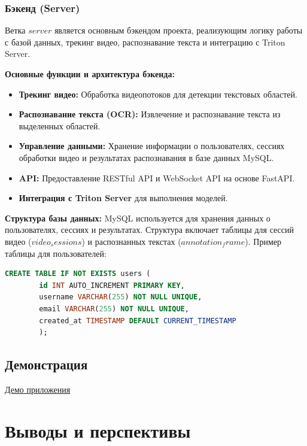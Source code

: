 \documentclass[12pt, a4paper]{article}
\theoremstyle{definition}
\theoremstyle{remark}
\begin{document}
	\subsubsection{Бэкенд (Server)}
	Ветка $server$ является основным бэкендом проекта, реализующим логику работы с базой данных, трекинг видео, распознавание текста и интеграцию с Triton Server.
	
	\textbf{Основные функции и архитектура бэкенда:}
	\begin{itemize}
		\item \textbf{Трекинг видео:} Обработка видеопотоков для детекции текстовых областей.
		\item \textbf{Распознавание текста (OCR):} Извлечение и распознавание текста из выделенных областей.
		\item \textbf{Управление данными:} Хранение информации о пользователях, сессиях обработки видео и результатах распознавания в базе данных MySQL.
		\item \textbf{API:} Предоставление RESTful API и WebSocket API на основе FastAPI.
		\item \textbf{Интеграция с Triton Server} для выполнения моделей.
	\end{itemize}
	
	\textbf{Структура базы данных:}
	MySQL используется для хранения данных о пользователях, сессиях и результатах. Структура включает таблицы для сессий видео ($video_sessions$) и распознанных текстах ($annotation_frame$). Пример таблицы для пользователей:
	\begin{lstlisting}[language=sql, caption=Пример таблицы для пользователей в MySQL]
		CREATE TABLE IF NOT EXISTS users (
		id INT AUTO_INCREMENT PRIMARY KEY,
		username VARCHAR(255) NOT NULL UNIQUE,
		email VARCHAR(255) NOT NULL UNIQUE,
		created_at TIMESTAMP DEFAULT CURRENT_TIMESTAMP
		);
	\end{lstlisting}
	
	\subsection{Демонстрация}
	\href{https://github.com/Prischli-Drink-Coffee/FrameReader?tab=readme-ov-file#%D0%B4%D0%B5%D0%BC%D0%BE%D0%BD%D1%81%D1%82%D1%80%D0%B0%D1%86%D0%B8%D1%8F-%D1%80%D0%B0%D0%B1%D0%BE%D1%82%D1%8B}{Демо приложения}
	
	\section{Выводы и перспективы}
\end{document}
